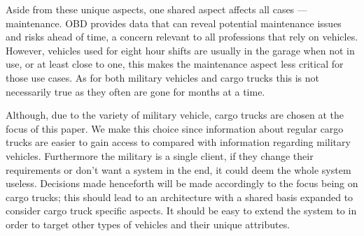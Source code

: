 \bigskip
Aside from these unique aspects, one shared aspect affects all cases --- maintenance.
\ac{OBD} provides data that can reveal potential maintenance issues and risks ahead of time, a concern relevant to all professions that rely on vehicles.
However, vehicles used for eight hour shifts are usually in the garage when not in use, or at least close to one, this makes the maintenance aspect less critical for those use cases.
As for both military vehicles and cargo trucks this is not necessarily true as they often are gone for months at a time.

Although, due to the variety of military vehicle, cargo trucks are chosen at the focus of this paper.
We make this choice since information about regular cargo trucks are easier to gain access to compared with information regarding military vehicles.
Furthermore the military is a single client, if they change their requirements or don't want a system in the end, it could deem the whole system useless.
Decisions made henceforth will be made accordingly to the focus being on cargo trucks; this should lead to an architecture with a shared basis expanded to consider cargo truck specific aspects.
It should be easy to extend the system to in order to target other types of vehicles and their unique attributes.
